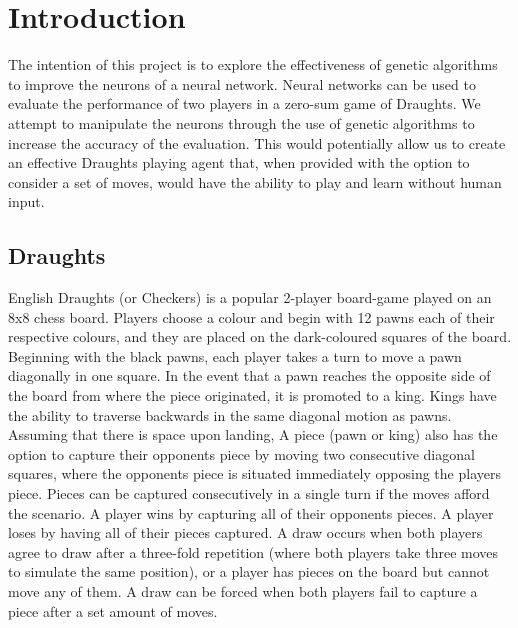 \documentclass[12pt,a4paper]{article}
\begin{document}
\section{Introduction}
    The intention of this project is to explore the effectiveness of genetic algorithms to improve the neurons of a neural network. Neural networks can be used to evaluate the performance of two players in a zero-sum game of Draughts. We attempt to manipulate the neurons through the use of genetic algorithms to increase the accuracy of the evaluation. This would potentially allow us to create an effective Draughts playing agent that, when provided with the option to consider a set of moves, would have the ability to play and learn without human input.

    \subsection*{Draughts}

    English Draughts (or Checkers) is a popular 2-player board-game played on an 8x8 chess board. Players choose a colour and begin with 12 pawns each of their respective colours, and they are placed on the dark-coloured squares of the board. Beginning with the black pawns, each player takes a turn to move a pawn diagonally in one square. In the event that a pawn reaches the opposite side of the board from where the piece originated, it is promoted to a king. Kings have the ability to traverse backwards in the same diagonal motion as pawns. Assuming that there is space upon landing, A piece (pawn or king) also has the option to capture their opponents piece by moving two consecutive diagonal squares, where the opponents piece is situated immediately opposing the players piece. Pieces can be captured consecutively in a single turn if the moves afford the scenario. A player wins by capturing all of their opponents pieces. A player loses by having all of their pieces captured. A draw occurs when both players agree to draw after a three-fold repetition (where both players take three moves to simulate the same position), or a player has pieces on the board but cannot move any of them. A draw can be forced when both players fail to capture a piece after a set amount of moves.
\end{document}
